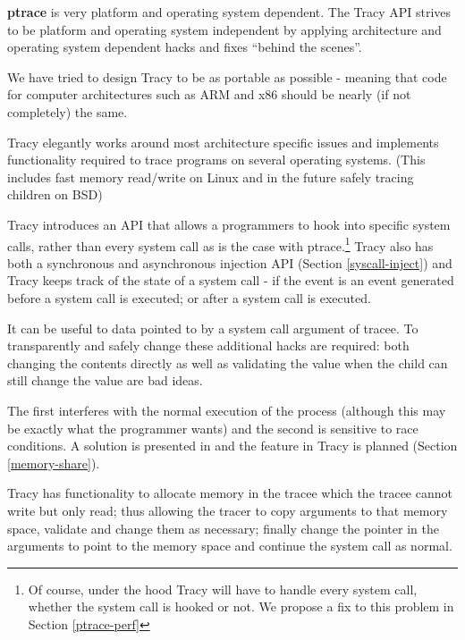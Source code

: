 \documentclass[a4paper, 10pt]{report}
\begin{document}
\textbf{ptrace} is very platform and operating system dependent.
The Tracy API strives to be platform and operating system independent by
applying architecture and operating system dependent hacks and fixes
``behind the scenes''.

We have tried to design Tracy to be as portable as possible - meaning that code
for computer architectures such as ARM and x86 should be nearly
(if not completely) the same.


Tracy elegantly works around most architecture specific issues and implements
functionality required to trace programs on several operating systems.
(This includes fast memory read/write on Linux and in the future safely tracing
children on BSD)

Tracy introduces an API that allows a programmers to hook into specific system
calls, rather than every system call as is the case with ptrace.\footnote{Of
course, under the hood Tracy will have to handle every system call, whether
the system call is hooked or not. We propose a fix to this problem in
Section \ref{ptrace-perf}} Tracy also has both a synchronous and asynchronous
injection API (Section \ref{syscall-inject}) and Tracy keeps
track of the state of a system call - if the event is an event generated before
a system call is executed; or after a system call is executed.

It can be useful to data pointed to by a system call argument of tracee.
To transparently and safely change these additional hacks are required:
both changing the contents directly as well as validating the value when the
child can still change the value are bad ideas.

The first interferes with the normal execution of the process
(although this may be exactly what the programmer wants) and the second is
sensitive to race conditions. A solution is presented in
\cite{Noordende_asecure} and the feature in Tracy is planned (Section
\ref{memory-share}).

Tracy has functionality to allocate memory in the tracee which
the tracee cannot write but only read; thus allowing the tracer
to copy arguments to that memory space, validate and change them as
necessary; finally change the pointer in the arguments to point to the memory
space and continue the system call as normal.
\end{document}
